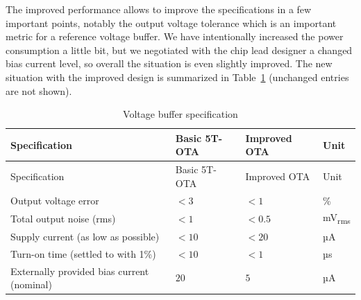 \documentclass[
  a4paper,
  DIV=11,
  numbers=noendperiod]{scrartcl}
\begin{document}
The improved performance allows to improve the specifications in a few
important points, notably the output voltage tolerance which is an
important metric for a reference voltage buffer. We have intentionally
increased the power consumption a little bit, but we negotiated with the
chip lead designer a changed bias current level, so overall the
situation is even slightly improved. The new situation with the improved
design is summarized in Table~\ref{tbl-voltage-buffer-spec-improved}
(unchanged entries are not shown).

\begin{longtable}[]{@{}
  >{\raggedright\arraybackslash}p{}
  >{\centering\arraybackslash}p{}
  >{\centering\arraybackslash}p{}
  >{\centering\arraybackslash}p{}@{}}
\caption{Voltage buffer
specification}\label{tbl-voltage-buffer-spec-improved}\tabularnewline
\toprule\noalign{}
\begin{minipage}[b]{\linewidth}\raggedright
Specification
\end{minipage} & \begin{minipage}[b]{\linewidth}\centering
Basic 5T-OTA
\end{minipage} & \begin{minipage}[b]{\linewidth}\centering
Improved OTA
\end{minipage} & \begin{minipage}[b]{\linewidth}\centering
Unit
\end{minipage} \\
\midrule\noalign{}
\endfirsthead
\toprule\noalign{}
\begin{minipage}[b]{\linewidth}\raggedright
Specification
\end{minipage} & \begin{minipage}[b]{\linewidth}\centering
Basic 5T-OTA
\end{minipage} & \begin{minipage}[b]{\linewidth}\centering
Improved OTA
\end{minipage} & \begin{minipage}[b]{\linewidth}\centering
Unit
\end{minipage} \\
\midrule\noalign{}
\endhead
\bottomrule\noalign{}
\endlastfoot
Output voltage error & \(<3\) & \(<1\) & \% \\
Total output noise (rms) & \(<1\) & \(<0.5\) & mV\textsubscript{rms} \\
Supply current (as low as possible) & \(<10\) & \(<20\) & µA \\
Turn-on time (settled to with 1\%) & \(<10\) & \(<1\) & µs \\
Externally provided bias current (nominal) & \(20\) & \(5\) & µA \\
\end{longtable}
\end{document}
